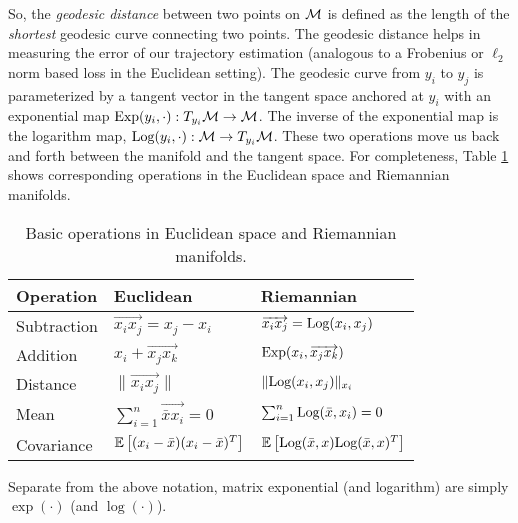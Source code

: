 So, the \textit{geodesic distance}
between two points on $\mathcal{M}$ is defined as the length of the {\em shortest} geodesic curve connecting two points.
The geodesic distance helps in measuring the error of our trajectory estimation (analogous to a Frobenius or $\ell_2$ norm based loss in the Euclidean setting).
The geodesic curve from $y_i$ to $y_j$  is parameterized by a tangent vector in the tangent space anchored at $y_i$ with an exponential map $\text{Exp}(y_i,\cdot ): T_{y_i}\mathcal{M} \rightarrow \mathcal{M}$. 
The inverse of the exponential map is the logarithm map, $\text{Log}(y_i,\cdot):\mathcal{M} \rightarrow T_{y_i}\mathcal{M}$. These two operations move us back and forth between 
the manifold and the tangent space. For completeness, Table \ref{tab:comp1} shows corresponding operations in the Euclidean space and Riemannian manifolds.
\begin{table}[]
	{
		\begin{center}
			\begin{tabular}{| l | l | l | }
				\hline
				Operation & Euclidean & Riemannian  \\  
				\hline 
				Subtraction & $\overrightarrow{x_i x_j} = x_j - x_i$ & $\overrightarrow{x_i x_j} = \text{Log}(x_i,x_j)$ \\ 
				 Addition & $x_i + \overrightarrow{x_j x_k}$ & $\text{Exp}(x_i,\overrightarrow{x_j x_k})$ \\     
				 Distance  & $\| \overrightarrow{x_i x_j} \|$ & $\|\text{Log}(x_i,x_j) \|_{x_i}$ \\ 
				Mean  & $\sum_{i=1}^{n} \overrightarrow{\bar{x}x_{i}}=0$ &  $\sum_{i=1}^{n} \text{Log}(\bar{x}, x_i)=0$  \\ 
				Covariance & $\mathbb{E} \left [ (x_i - \bar{x})(x_i - \bar{x})^{T} \right ]$& $\mathbb{E} \left [ \text{Log}(\bar{x}, x)\text{Log}(\bar{x}, x)^{T} \right ]$\\ [1ex] \hline 
			\end{tabular}
		\end{center}
	}
	\caption{\label{tab:comp1} Basic operations in Euclidean space and Riemannian manifolds.}
\end{table}
Separate from the above notation, matrix exponential (and logarithm) are simply $\exp(\cdot)$ (and $\log(\cdot)$).  
